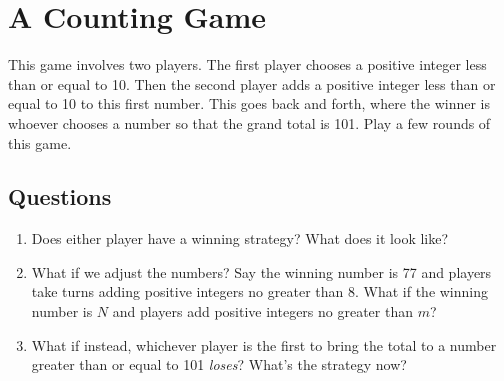 \documentclass[12pt]{article}
\begin{document}
\section*{A Counting Game}
This game involves two players. The first player chooses a positive integer less than or equal to 10. Then the second player adds a positive integer less than or equal to 10 to this first number. This goes back and forth, where the winner is whoever chooses a number so that the grand total is 101. Play a few rounds of this game.

\subsection*{Questions}
\begin{enumerate}
	\item Does either player have a winning strategy? What does it look like?
	\vspace{4cm}
	\item What if we adjust the numbers? Say the winning number is 77 and players take turns adding positive integers no greater than 8. What if the winning number is $N$ and players add positive integers no greater than $m$?
	\vspace{4cm}
	\item What if instead, whichever player is the first to bring the total to a number greater than or equal to 101 \textit{loses}? What's the strategy now?
\end{enumerate}

\newpage
\end{document}
